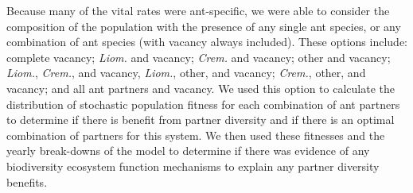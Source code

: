 \documentclass[12pt,a4paper]{article}
\begin{document}
Because many of the vital rates were ant-specific, we were able to consider the composition of the population with the presence of any single ant species, or any combination of ant species (with vacancy always included).
These options include: complete vacancy; \textit{Liom.} and vacancy; \textit{Crem.} and vacancy; other and vacancy; \textit{Liom.}, \textit{Crem.}, and vacancy, \textit{Liom.}, other, and vacancy; \textit{Crem.}, other, and vacancy; and all ant partners and vacancy.
We used this option to calculate the distribution of stochastic population fitness for each combination of ant partners to determine if there is benefit from partner diversity and if there is an optimal combination of partners for this system. 
We then used these fitnesses and the yearly break-downs of the model to determine if there was evidence of any biodiversity ecosystem function mechanisms to explain any partner diversity benefits. 
\end{document}
